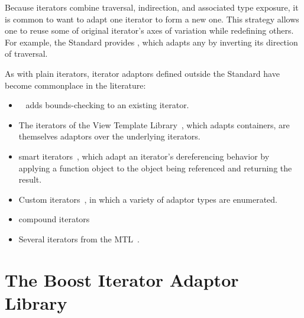 \documentclass{netobjectdays}
\newcommand{\reverseiterator}{\code{reverse\_\-iterator}}
\begin{document}
Because iterators combine traversal, indirection, and associated type
exposure, it is common to want to adapt one iterator to form a new
one. This strategy allows one to reuse some of original iterator's
axes of variation while redefining others. For example, the Standard
provides \reverseiterator{}, which adapts any
 by inverting its direction of
traversal.

As with plain iterators, iterator adaptors defined outside the
Standard have become commonplace in the literature:\begin{itemize}

\item {}~\cite{stroustrup00:_cpp_prog_lang} adds
bounds-checking to an existing iterator.

 \item The iterators of the View Template
Library~\cite{TMPW00:Weiser}, which adapts containers, are themselves
adaptors over the underlying iterators.

 \item smart iterators~\cite{becker98:_smart_iterators},
which adapt an iterator's dereferencing behavior by applying a
function object to the object being referenced and returning the
result.

 \item Custom iterators~\cite{TMPW00:Baus},
in which a variety of adaptor types are enumerated.

 \item compound iterators~\cite{alexandrescu98:_compound_iters}

 \item Several iterators from the MTL~\cite{siek99:_scitools}.

\end{itemize}

\section{The Boost Iterator Adaptor Library}


\end{document}
